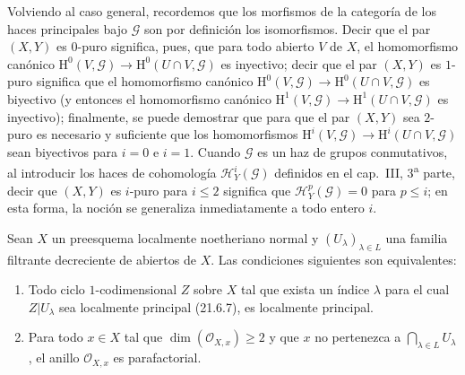 \begin{remark}[21.13.13]
Volviendo al caso general, recordemos que los morfismos de la categoría de los haces
principales bajo $\mathscr G$ son por definición los isomorfismos. Decir que el par
$(X,Y)$ es $0$-puro significa, pues, que para todo abierto $V$ de $X$, el homomorfismo
canónico $\mathrm H^0(V,\mathscr G)\to\mathrm H^0(U\cap V,\mathscr G)$ es inyectivo;
decir que el par $(X,Y)$ es $1$-puro significa que el homomorfismo canónico
$\mathrm H^0(V,\mathscr G)\to\mathrm H^0(U\cap V,\mathscr G)$ es biyectivo (y entonces
el homomorfismo canónico
$\mathrm H^1(V,\mathscr G)\to\mathrm H^1(U\cap V,\mathscr G)$ es inyectivo); finalmente,
se puede demostrar que para que el par $(X,Y)$ sea $2$-puro es necesario y suficiente que
los homomorfismos
$\mathrm H^i(V,\mathscr G)\to\mathrm H^i(U\cap V,\mathscr G)$ sean biyectivos para
$i=0$ e $i=1$. Cuando $\mathscr G$ es un haz de grupos conmutativos, al
introducir los haces de cohomología $\mathscr H_Y^i(\mathscr G)$ definidos en el
cap.~III, 3\textsuperscript{a} parte, decir que $(X,Y)$ es $i$-puro para $i\leq2$
significa que $\mathscr H_Y^p(\mathscr G)=0$ para $p\leq i$; en esta forma, la
noción se generaliza inmediatamente a todo entero $i$.
\end{remark}

\begin{proposition}[21.13.14]
\label{IV.21.13.14}
Sean $X$ un preesquema localmente noetheriano normal y
$(U_\lambda)_{\lambda\in L}$ una familia filtrante decreciente de abiertos de $X$. Las
condiciones siguientes son equivalentes:
\begin{enumerate}[label=\emph{\alph*)}]
  \item Todo ciclo $1$-codimensional $Z$ sobre $X$ tal que exista un índice
  $\lambda$ para el cual $Z|U_\lambda$ sea localmente principal \textup{(21.6.7)}, es
  localmente principal.
  \item Para todo $x\in X$ tal que $\dim(\mathcal O_{X,x})\geq2$ y que $x$
  no pertenezca a $\bigcap_{\lambda\in L}U_\lambda$, el anillo
  $\mathcal O_{X,x}$ es parafactorial.
\end{enumerate}
\end{proposition}

